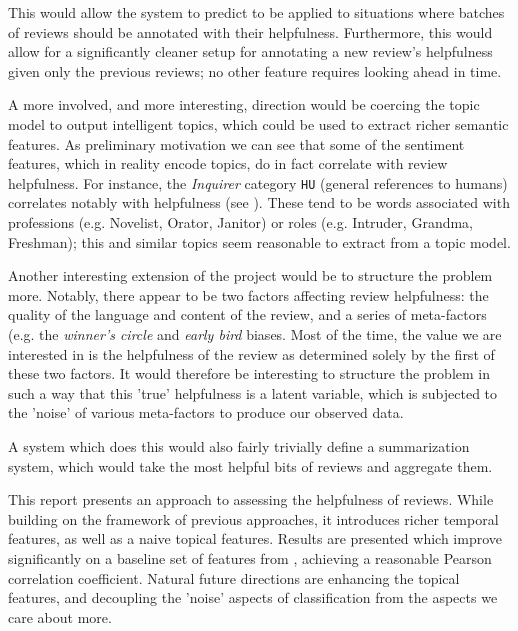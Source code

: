 \documentclass[letter,10pt]{article}
\begin{document}
This would allow the system to predict to be applied to situations where
	batches of reviews should be annotated with their helpfulness.
Furthermore, this would allow for a significantly cleaner setup for
	annotating a new review's helpfulness given only the previous
	reviews;
	no other feature requires looking ahead in time.

A more involved, and more interesting, direction would be coercing
	the topic model to output intelligent topics, which could be used
	to extract richer semantic features.
As preliminary motivation we can see that some of the sentiment features,
	which in reality encode topics, do in fact correlate with
	review helpfulness.
For instance, the {\em Inquirer} category {\tt HU} (general references
	to humans) correlates notably with helpfulness
	(see ).
These tend to be words associated with professions (e.g. Novelist, Orator,
	Janitor) or roles (e.g. Intruder, Grandma, Freshman);
	this and similar topics seem reasonable to extract from a topic model.


Another interesting extension of the project would be to structure the problem
	more.
Notably, there appear to be two factors affecting review helpfulness:
	the quality of the language and content of the review,
	and a series of meta-factors (e.g. the {\em winner's circle} and
	{\em early bird} biases.
Most of the time, the value we are interested in is the helpfulness
	of the review as determined solely by the first of these two factors.
It would therefore be interesting to structure the problem in such a way
	that this 'true' helpfulness is a latent variable, which is subjected
	to the 'noise' of various meta-factors to produce our observed data.

A system which does this would also fairly trivially define a summarization
	system, which would take the most helpful bits of reviews and
	aggregate them.

This report presents an approach to assessing the helpfulness of reviews.
While building on the framework of previous approaches, it introduces
	richer temporal features, as well as a naive topical features.
Results are presented which improve significantly on a baseline set of 
	features from , achieving a reasonable
	Pearson correlation coefficient.
Natural future directions are enhancing the topical features, and
	decoupling the 'noise' aspects of classification from the aspects
	we care about more.




\end{document}
